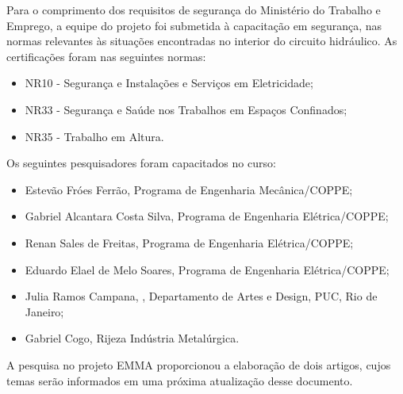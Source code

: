 Para o comprimento dos requisitos de segurança do Ministério do Trabalho e
Emprego, a equipe do projeto foi submetida à capacitação em segurança, nas
normas relevantes às situações encontradas no interior do circuito hidráulico. As certificações foram nas
seguintes normas:

\begin{itemize}
  \item NR10 - Segurança e Instalações e Serviços em Eletricidade;
  \item NR33 - Segurança e Saúde nos Trabalhos em Espaços Confinados;
  \item NR35 - Trabalho em Altura.
\end{itemize}

Os seguintes pesquisadores foram capacitados no curso:

\begin{itemize}
  \item Estevão Fróes Ferrão, Programa de Engenharia Mecânica/COPPE;
  \item Gabriel Alcantara Costa Silva, Programa de Engenharia Elétrica/COPPE;
  \item Renan Sales de Freitas, Programa de Engenharia Elétrica/COPPE;
  \item Eduardo Elael de Melo Soares, Programa de Engenharia Elétrica/COPPE;
  \item Julia Ramos Campana, , Departamento de Artes e Design, PUC, Rio de
  Janeiro;
  \item Gabriel Cogo, Rijeza Indústria Metalúrgica.
\end{itemize}

A pesquisa no projeto EMMA proporcionou a elaboração de dois artigos, cujos
temas serão informados em uma próxima atualização desse documento.


% 

